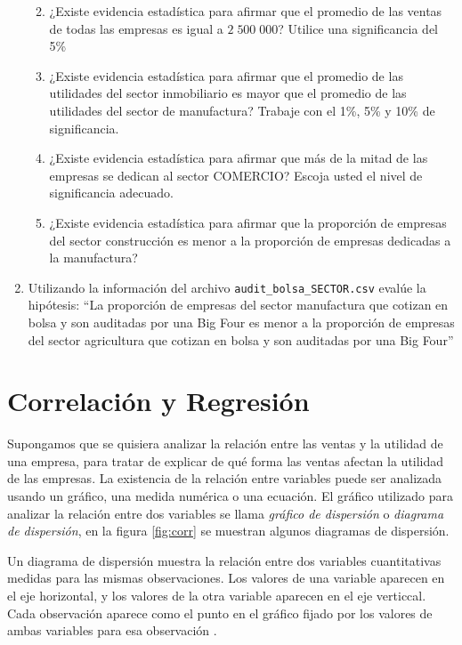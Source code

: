 \documentclass[
]{krantz}
\providecommand{\tightlist}{%
  \setlength{\itemsep}{0pt}\setlength{\parskip}{0pt}}
\begin{document}
\begin{enumerate}
  \begin{enumerate}
  \def\labelenumii{\alph{enumii}.}
  \tightlist
  \item
    ¿Existe evidencia estadística para afirmar que el promedio de las ventas de todas las empresas es igual a \(2\;500\;000\)? Utilice una significancia del 5\%
  \item
    ¿Existe evidencia estadística para afirmar que el promedio de las utilidades del sector inmobiliario es mayor que el promedio de las utilidades del sector de manufactura? Trabaje con el 1\%, 5\% y 10\% de significancia.
  \item
    ¿Existe evidencia estadística para afirmar que más de la mitad de las empresas se dedican al sector COMERCIO? Escoja usted el nivel de significancia adecuado.
  \item
    ¿Existe evidencia estadística para afirmar que la proporción de empresas del sector construcción es menor a la proporción de empresas dedicadas a la manufactura?
  \end{enumerate}
\item
  Utilizando la información del archivo \texttt{audit\_bolsa\_SECTOR.csv} evalúe la hipótesis: ``La proporción de empresas del sector manufactura que cotizan en bolsa y son auditadas por una Big Four es menor a la proporción de empresas del sector agricultura que cotizan en bolsa y son auditadas por una Big Four''
\end{enumerate}

\hypertarget{methods}{%
\chapter{Correlación y Regresión}\label{methods}}

Supongamos que se quisiera analizar la relación entre las ventas y la utilidad de una empresa, para tratar de explicar de qué forma las ventas afectan la utilidad de las empresas. La existencia de la relación entre variables puede ser analizada usando un gráfico, una medida numérica o una ecuación.
El gráfico utilizado para analizar la relación entre dos variables se llama \emph{gráfico de dispersión} o \emph{diagrama de dispersión}, en la figura \ref{fig:corr} se muestran algunos diagramas de dispersión.

Un diagrama de dispersión muestra la relación entre dos variables cuantitativas medidas para las mismas observaciones. Los valores de una variable aparecen en el eje horizontal, y los valores de la otra variable aparecen en el eje verticcal. Cada observación aparece como el punto en el gráfico fijado por los valores de ambas variables para esa observación .
\end{document}
